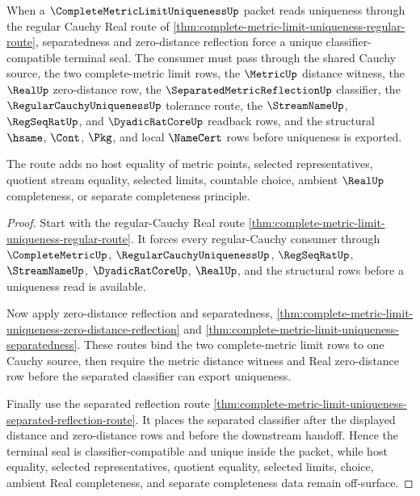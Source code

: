 \begin{theorem}
\label{thm:complete-metric-limit-uniqueness-separated-route}
When a $\CompleteMetricLimitUniquenessUp$ packet reads uniqueness through the regular Cauchy Real route of \autoref{thm:complete-metric-limit-uniqueness-regular-route}, separatedness and zero-distance reflection force a unique classifier-compatible terminal seal. The consumer must pass through the shared Cauchy source, the two complete-metric limit rows, the $\MetricUp$ distance witness, the $\RealUp$ zero-distance row, the $\SeparatedMetricReflectionUp$ classifier, the $\RegularCauchyUniquenessUp$ tolerance route, the $\StreamNameUp$, $\RegSeqRatUp$, and $\DyadicRatCoreUp$ readback rows, and the structural $\hsame$, $\Cont$, $\Pkg$, and local $\NameCert$ rows before uniqueness is exported.

The route adds no host equality of metric points, selected representatives, quotient stream equality, selected limits, countable choice, ambient $\RealUp$ completeness, or separate completeness principle.
\end{theorem}
\begin{proof}
Start with the regular-Cauchy Real route \autoref{thm:complete-metric-limit-uniqueness-regular-route}. It forces every regular-Cauchy consumer through $\CompleteMetricUp$, $\RegularCauchyUniquenessUp$, $\RegSeqRatUp$, $\StreamNameUp$, $\DyadicRatCoreUp$, $\RealUp$, and the structural rows before a uniqueness read is available.

Now apply zero-distance reflection and separatedness, \autoref{thm:complete-metric-limit-uniqueness-zero-distance-reflection} and \autoref{thm:complete-metric-limit-uniqueness-separatedness}. These routes bind the two complete-metric limit rows to one Cauchy source, then require the metric distance witness and Real zero-distance row before the separated classifier can export uniqueness.

Finally use the separated reflection route \autoref{thm:complete-metric-limit-uniqueness-separated-reflection-route}. It places the separated classifier after the displayed distance and zero-distance rows and before the downstream handoff. Hence the terminal seal is classifier-compatible and unique inside the packet, while host equality, selected representatives, quotient equality, selected limits, choice, ambient Real completeness, and separate completeness data remain off-surface.
\end{proof}
